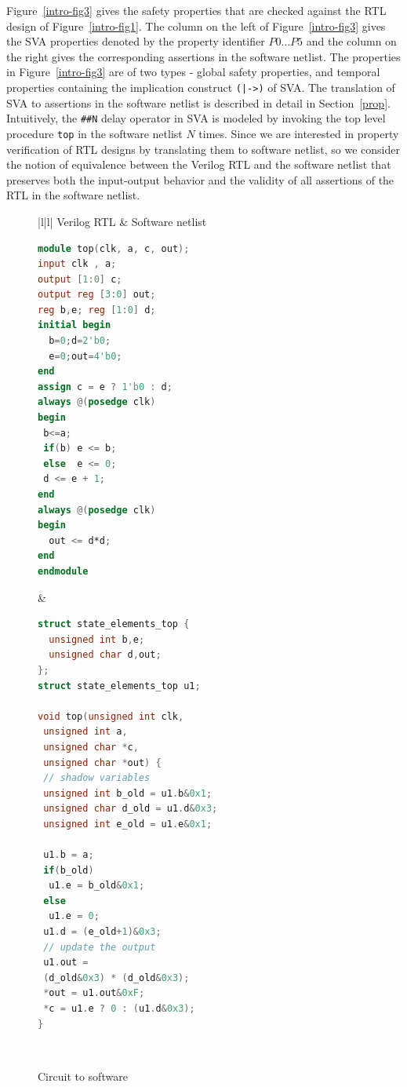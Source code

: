 Figure~\ref{intro-fig3} gives the safety properties that are checked 
against the RTL design of Figure~\ref{intro-fig1}.  The column on the 
left of Figure~\ref{intro-fig3} 
gives the SVA properties denoted by the property identifier 
$P0 \ldots P5$ and the column on the right gives the 
corresponding assertions in the software netlist.  The properties 
in Figure~\ref{intro-fig3} are of two types - global safety properties, 
and temporal properties containing the implication construct \texttt{(|->)} of SVA.  
The translation of SVA to assertions in the software netlist is described 
in detail in Section~\ref{prop}. 
%  
Intuitively, the \texttt{\#\#N} delay operator in SVA is modeled by invoking 
the top level procedure \texttt{top} in the software netlist $N$ times.  
Since we are interested in property verification of RTL designs by translating 
them to software netlist, so we consider the notion of equivalence between 
the Verilog RTL and the software netlist that preserves both the 
input-output behavior and the validity of all assertions of the RTL in the 
software netlist. 
%
\begin{figure}[t]
\centering
\scriptsize
\begin{tabular}{|l|l|}
\hline
 Verilog RTL & Software netlist \\
\hline
\begin{lstlisting}[mathescape=true,language=Verilog,basicstyle=\footnotesize\ttfamily]
module top(clk, a, c, out); 
input clk , a;
output [1:0] c;
output reg [3:0] out;
reg b,e; reg [1:0] d;
initial begin
  b=0;d=2'b0;
  e=0;out=4'b0;
end
assign c = e ? 1'b0 : d; 
always @(posedge clk) 
begin
 b<=a;
 if(b) e <= b; 
 else  e <= 0; 
 d <= e + 1;
end
always @(posedge clk) 
begin
  out <= d*d;
end  
endmodule
\end{lstlisting}
&
\begin{lstlisting}[mathescape=true,language=C]
struct state_elements_top {
  unsigned int b,e;
  unsigned char d,out;
};
struct state_elements_top u1;

void top(unsigned int clk, 
 unsigned int a, 
 unsigned char *c, 
 unsigned char *out) {
 // shadow variables 
 unsigned int b_old = u1.b&0x1;
 unsigned char d_old = u1.d&0x3;
 unsigned int e_old = u1.e&0x1;
  
 u1.b = a;
 if(b_old) 
  u1.e = b_old&0x1;
 else
  u1.e = 0;
 u1.d = (e_old+1)&0x3;
 // update the output 
 u1.out = 
 (d_old&0x3) * (d_old&0x3);
 *out = u1.out&0xF;
 *c = u1.e ? 0 : (u1.d&0x3);
}
\end{lstlisting}
\\
\hline
\end{tabular}
\caption{Circuit to software}
\label{intro-fig2}
\end{figure}
